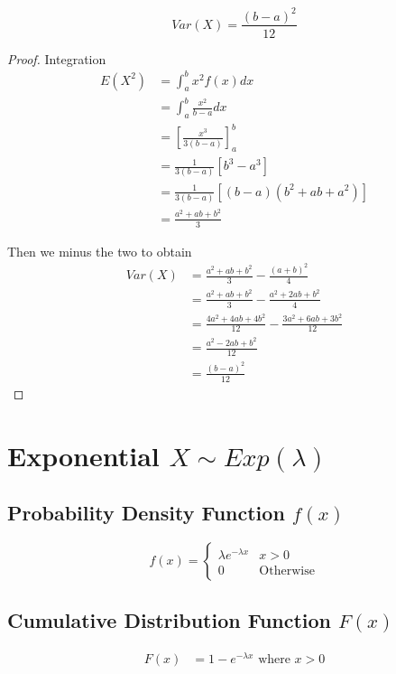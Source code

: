 \documentclass[12pt]{article}
\begin{document}
\begin{equation*}
  Var(X)= \frac{(b-a)^{2}}{12}
\end{equation*}
\begin{proof} Integration
  \begin{align*}
    E(X^{2}) &= \int_{a}^{b} x^{2} f(x) dx \\
         &= \int_{a}^{b} \frac{x^{2}}{b-a} dx \\
         &= \left[\frac{x^{3}}{3(b-a)}\right]_{a}^{b} \\
         &= \frac{1}{3(b-a)}[b^{3}-a^{3}] \\
         &= \frac{1}{3(b-a)}[(b-a)(b^{2}+ab+a^{2})] \\
         &= \frac{a^{2}+ab+b^{2}}{3}
  \end{align*}

  Then we minus the two to obtain
  \begin{align*}
    Var(X) &= \frac{a^{2}+ab+b^{2}}{3} - \frac{(a+b)^{2}}{4} \\
           &= \frac{a^{2}+ab+b^{2}}{3} - \frac{a^{2}+2ab+b^{2}}{4} \\
           &= \frac{4a^{2}+4ab+4b^{2}}{12} - \frac{3a^{2}+6ab+3b^{2}}{12} \\
           &= \frac{a^{2}-2ab+b^{2}}{12} \\
           &= \frac{(b-a)^{2}}{12}
  \end{align*}
\end{proof}

\newpage
\section{Exponential $X \sim Exp(\lambda)$}
\subsection{Probability Density Function $f(x)$}

\begin{equation*}
  f(x) =
  \begin{cases}
     \lambda e^{-\lambda x} & x>0 \\
     0 & \text{Otherwise}
  \end{cases}
\end{equation*}

\subsection{Cumulative Distribution Function $F(x)$}
\begin{align*}
  F(x) &= 1-e^{-\lambda x} \text{ where $x>0$}\\
\end{align*}
\end{document}
